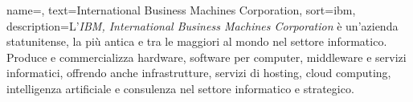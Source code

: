 {
	name=,
	text=International Business Machines Corporation,
	sort=ibm,
	description={L'\emph{IBM, International Business Machines Corporation} è un'azienda statunitense, la più antica e tra le maggiori al mondo nel settore informatico. Produce e commercializza hardware, software per computer, middleware e servizi informatici, offrendo anche infrastrutture, servizi di hosting, cloud computing, intelligenza artificiale e consulenza nel settore informatico e strategico.}
}

